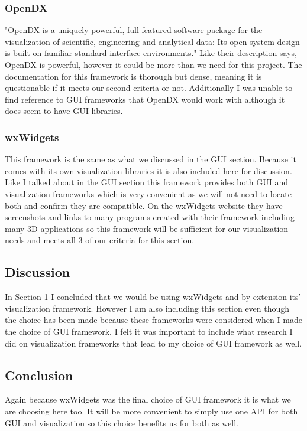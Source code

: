 \documentclass[onecolumn, draftclsnofoot,10pt, compsoc]{IEEEtran}
\begin{document}
\subsubsection{OpenDX}
"OpenDX is a uniquely powerful, full-featured software package for the visualization of scientific, engineering and analytical data: Its open system design is built on familiar standard interface environments." \cite{opendx} 
Like their description says, OpenDX is powerful, however it could be more than we need for this project. 
The documentation for this framework is thorough but dense, meaning it is questionable if it meets our second criteria or not.
Additionally I was unable to find reference to GUI frameworks that OpenDX would work with although it does seem to have GUI libraries.

\subsubsection{wxWidgets}
This framework is the same as what we discussed in the GUI section. 
Because it comes with its own visualization libraries it is also included here for discussion. \cite{wx}
Like I talked about in the GUI section this framework provides both GUI and visualization frameworks which is very convenient as we will not need to locate both and confirm they are compatible. On the wxWidgets website they have screenshots and links to many programs created with their framework including many 3D applications so this framework will be sufficient for our visualization needs and meets all 3 of our criteria for this section.

\subsection{Discussion}
In Section 1 I concluded that we would be using wxWidgets and by extension its' visualization framework. However I am also including this section even though the choice has been made because these frameworks were considered when I made the choice of GUI framework. I felt it was important to include what research I did on visualization frameworks that lead to my choice of GUI framework as well.

\subsection{Conclusion}
Again because wxWidgets was the final choice of GUI framework it is what we are choosing here too. It will be more convenient to simply use one API for both GUI and visualization so this choice benefits us for both as well.


\printbibliography
\end{document}
